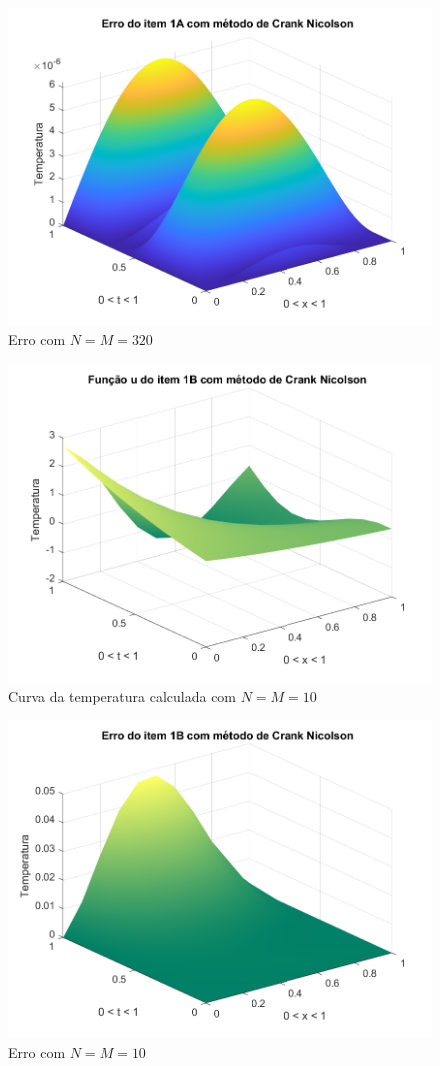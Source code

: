\documentclass[12pt]{article}
\begin{document}
\begin{spacing}{1.5}
\begin{figure}
    \centering
    \includegraphics[width=0.8\linewidth]{Segunda_Tarefa/ItemC/nm320_erro_A.png}
    \caption{Erro com $N=M=320$}
    \label{fig:CA_nm320_erro}
\end{figure}

\begin{figure}
    \centering
    \includegraphics[width=0.8\linewidth]{Segunda_Tarefa/ItemC/nm10_calculada_B.png}
    \caption{Curva da temperatura calculada com $N=M=10$}
    \label{fig:CB_nm10_calculada}
\end{figure}

\begin{figure}
    \centering
    \includegraphics[width=0.8\linewidth]{Segunda_Tarefa/ItemC/nm10_erro_B.png}
    \caption{Erro com $N=M=10$}
    \label{fig:CB_nm10_erro}
\end{figure}


\end{spacing}
\end{document}
